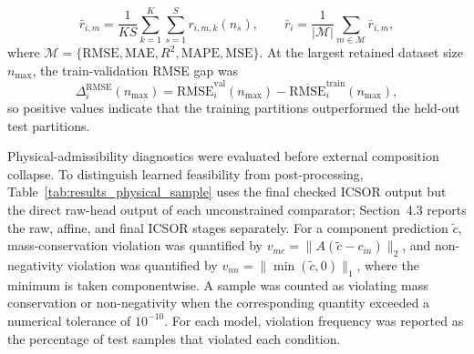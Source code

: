 \documentclass[a4paper,fleqn]{cas-sc}
\newenvironment{currentrevblock}{\begingroup\color{currentRevisionBlue}}{\endgroup}
\newenvironment{currentrevblock}{}{}
\newenvironment{revblock}{}{}
\newenvironment{revblockr25}{}{}
\begin{document}
\begin{revblock}
\begin{revblockr25}
\begin{equation}
\bar{r}_{i,m} = \frac{1}{KS} \sum_{k=1}^{K} \sum_{s=1}^{S} r_{i,m,k}(n_s),
\qquad
\bar{r}_{i} = \frac{1}{|\mathcal{M}|} \sum_{m \in \mathcal{M}} \bar{r}_{i,m},
\end{equation}
where $\mathcal{M} = \{\mathrm{RMSE},\mathrm{MAE},R^2,\mathrm{MAPE},\mathrm{MSE}\}$. At the largest retained dataset size $n_{\max}$, the train-validation RMSE gap was
\begin{equation}
\Delta_i^{\mathrm{RMSE}}(n_{\max}) = \overline{\mathrm{RMSE}}^{\mathrm{val}}_i(n_{\max}) - \overline{\mathrm{RMSE}}^{\mathrm{train}}_i(n_{\max}),
\end{equation}
so positive values indicate that the training partitions outperformed the held-out test partitions.

\begin{currentrevblock}
Physical-admissibility diagnostics were evaluated before external composition collapse. To distinguish learned feasibility from post-processing, Table~\ref{tab:results_physical_sample} uses the final checked ICSOR output but the direct raw-head output of each unconstrained comparator; Section~4.3 reports the raw, affine, and final ICSOR stages separately. For a component prediction $\tilde{c}$, mass-conservation violation was quantified by $v_{mc} = \|A(\tilde{c} - c_{in})\|_2$, and non-negativity violation was quantified by $v_{nn} = \|\min(\tilde{c}, 0)\|_1$, where the minimum is taken componentwise. A sample was counted as violating mass conservation or non-negativity when the corresponding quantity exceeded a numerical tolerance of $10^{-10}$. For each model, violation frequency was reported as the percentage of test samples that violated each condition.
\end{currentrevblock}
\end{revblockr25}

\end{revblock}
\end{document}
